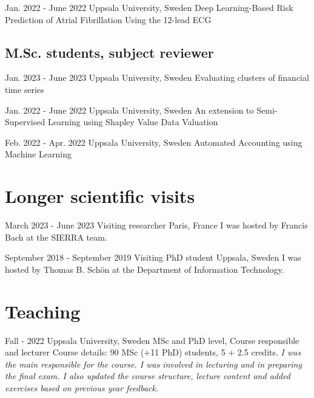 \documentclass[10pt,letterpaper]{article} %
\begin{document}
        { Jan. 2022 - June 2022 }
        {  }
        { Uppsala University, Sweden }
        { { Deep Learning-Based Risk Prediction of Atrial Fibrillation Using the 12-lead ECG } }
        

\subsection*{\noindent M.Sc. students, subject reviewer  }
    
        { Jan. 2023 - June 2023 }
        {  }
        { Uppsala University, Sweden }
        { { Evaluating clusters of financial time series } }
        
        { Jan. 2022 - June 2022 }
        {  }
        { Uppsala University, Sweden }
        { { An extension to Semi-Supervised Learning using Shapley Value Data Valuation } }
        
        { Feb. 2022 - Apr. 2022 }
        {  }
        { Uppsala University, Sweden }
        { { Automated Accounting using Machine Learning } }
        


\section*{Longer scientific visits}

    
        { March 2023 - June 2023 }
        { Visiting researcher }
        { Paris, France }
        { I was hosted by Francis Bach at the SIERRA team.}
    
        { September 2018 - September 2019 }
        { Visiting PhD student }
        { Uppsala, Sweden }
        { I was hosted by Thomas B. Schön at the Department of Information Technology.}
    

\section*{Teaching}


    {   Fall - 2022  }
    { Uppsala University, Sweden }
    { MSc and PhD level, Course responsible and lecturer }
    { Course details: 90 MSc (+11 PhD) students, 5 + 2.5 credits.  \emph{ I was the main responsible for the course. I was involved in lecturing and in preparing the final exam. I also updated the course structure, lecture content and added exercises based on previous year feedback. } }
    
\end{document}
